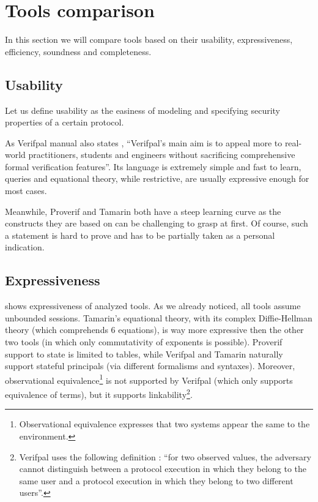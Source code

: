 
\section{Tools comparison}
\label{section:features-comparison}
In this section we will compare tools based on their usability, expressiveness, efficiency, soundness and completeness.

\subsection{Usability}
Let us define usability as the easiness of modeling and specifying security properties of a certain protocol.

As Verifpal manual also states \cite{VerifpalManual}, ``Verifpal's main aim is to appeal more to real-world practitioners, students and engineers without sacrificing comprehensive formal verification features''. Its language is extremely simple and fast to learn, queries and equational theory, while restrictive, are usually expressive enough for most cases.

Meanwhile, Proverif and Tamarin both have a steep learning curve as the constructs they are based on can be challenging to grasp at first. Of course, such a statement is hard to prove and has to be partially taken as a personal indication.

\subsection{Expressiveness}
 shows expressiveness of analyzed tools.
As we already noticed, all tools assume unbounded sessions. Tamarin's equational theory, with its complex Diffie-Hellman theory (which comprehends 6 equations), is way more expressive then the other two tools (in which only commutativity of exponents is possible).
Proverif support to state is limited to tables, while Verifpal and Tamarin naturally support stateful principals (via different formalisms and syntaxes). Moreover, observational equivalence\footnote{Observational equivalence expresses that two systems appear the same to the environment.} is not supported by Verifpal (which only supports equivalence of terms), but it supports linkability\footnote{Verifpal uses the following definition \cite{VerifpalFoundations}: ``for two
observed values, the adversary cannot distinguish between a protocol execution in
which they belong to the same user and a protocol execution in which they belong to
two different users''.}.

